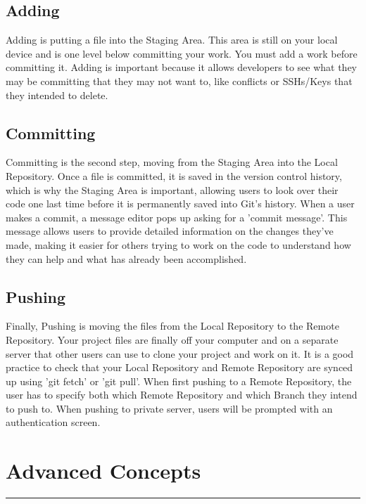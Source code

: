 \documentclass{article}
\begin{document}
\vspace{15pt}
\subsection*{Adding}
Adding is putting a file into the Staging Area. This area is still on your local device and is one level below committing your work. You must add a work before committing it. Adding is important because it allows developers to see what they may be committing that they may not want to, like conflicts or SSHs/Keys that they intended to delete.
\vspace{15pt}
\subsection*{Committing}
Committing is the second step, moving from the Staging Area into the Local Repository. Once a file is committed, it is saved in the version control history, which is why the Staging Area is important, allowing users to look over their code one last time before it is permanently saved into Git's history. When a user makes a commit, a message editor pops up asking for a 'commit message'. This message allows users to provide detailed information on the changes they've made, making it easier for others trying to work on the code to understand how they can help and what has already been accomplished.
\vspace{15pt}
\subsection*{Pushing}
Finally, Pushing is moving the files from the Local Repository to the Remote Repository. Your project files are finally off your computer and on a separate server that other users can use to clone your project and work on it. It is a good practice to check that your Local Repository and Remote Repository are synced up using 'git fetch' or 'git pull'. When first pushing to a Remote Repository, the user has to specify both which Remote Repository and which Branch they intend to push to. When pushing to private server, users will be prompted with an authentication screen. 
\vspace{55pt}

\section*{Advanced Concepts}
\hrule
\vspace{15pt}
\end{document}
